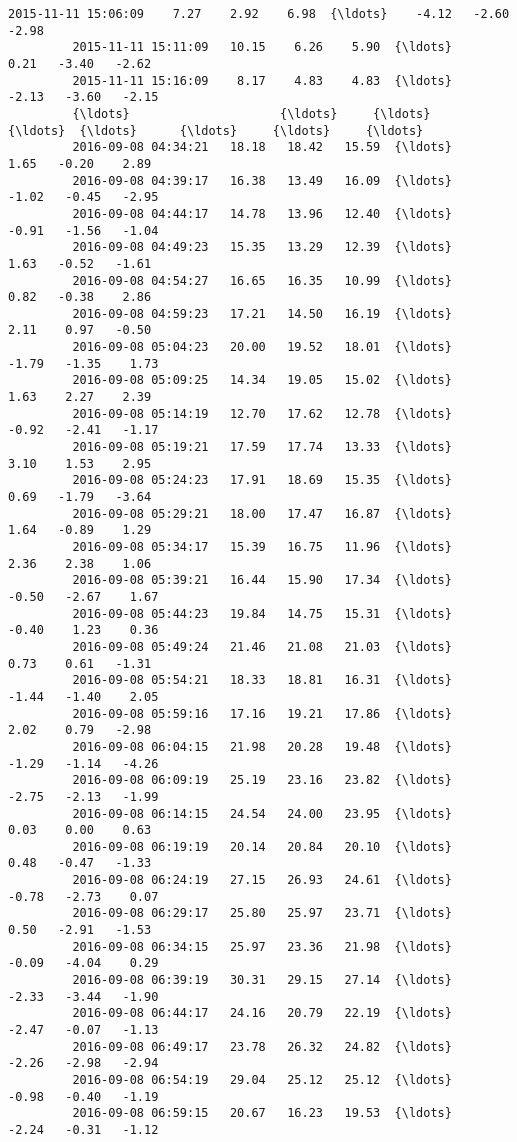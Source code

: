 \documentclass[a4paper,dvipdfmx]{jsarticle}
\begin{document}
\begin{Verbatim}[commandchars=\\\{\}]
         2015-11-11 15:06:09    7.27    2.92    6.98  {\ldots}    -4.12   -2.60   -2.98   
         2015-11-11 15:11:09   10.15    6.26    5.90  {\ldots}     0.21   -3.40   -2.62   
         2015-11-11 15:16:09    8.17    4.83    4.83  {\ldots}    -2.13   -3.60   -2.15   
         {\ldots}                     {\ldots}     {\ldots}     {\ldots}  {\ldots}      {\ldots}     {\ldots}     {\ldots}   
         2016-09-08 04:34:21   18.18   18.42   15.59  {\ldots}     1.65   -0.20    2.89   
         2016-09-08 04:39:17   16.38   13.49   16.09  {\ldots}    -1.02   -0.45   -2.95   
         2016-09-08 04:44:17   14.78   13.96   12.40  {\ldots}    -0.91   -1.56   -1.04   
         2016-09-08 04:49:23   15.35   13.29   12.39  {\ldots}     1.63   -0.52   -1.61   
         2016-09-08 04:54:27   16.65   16.35   10.99  {\ldots}     0.82   -0.38    2.86   
         2016-09-08 04:59:23   17.21   14.50   16.19  {\ldots}     2.11    0.97   -0.50   
         2016-09-08 05:04:23   20.00   19.52   18.01  {\ldots}    -1.79   -1.35    1.73   
         2016-09-08 05:09:25   14.34   19.05   15.02  {\ldots}     1.63    2.27    2.39   
         2016-09-08 05:14:19   12.70   17.62   12.78  {\ldots}    -0.92   -2.41   -1.17   
         2016-09-08 05:19:21   17.59   17.74   13.33  {\ldots}     3.10    1.53    2.95   
         2016-09-08 05:24:23   17.91   18.69   15.35  {\ldots}     0.69   -1.79   -3.64   
         2016-09-08 05:29:21   18.00   17.47   16.87  {\ldots}     1.64   -0.89    1.29   
         2016-09-08 05:34:17   15.39   16.75   11.96  {\ldots}     2.36    2.38    1.06   
         2016-09-08 05:39:21   16.44   15.90   17.34  {\ldots}    -0.50   -2.67    1.67   
         2016-09-08 05:44:23   19.84   14.75   15.31  {\ldots}    -0.40    1.23    0.36   
         2016-09-08 05:49:24   21.46   21.08   21.03  {\ldots}     0.73    0.61   -1.31   
         2016-09-08 05:54:21   18.33   18.81   16.31  {\ldots}    -1.44   -1.40    2.05   
         2016-09-08 05:59:16   17.16   19.21   17.86  {\ldots}     2.02    0.79   -2.98   
         2016-09-08 06:04:15   21.98   20.28   19.48  {\ldots}    -1.29   -1.14   -4.26   
         2016-09-08 06:09:19   25.19   23.16   23.82  {\ldots}    -2.75   -2.13   -1.99   
         2016-09-08 06:14:15   24.54   24.00   23.95  {\ldots}     0.03    0.00    0.63   
         2016-09-08 06:19:19   20.14   20.84   20.10  {\ldots}     0.48   -0.47   -1.33   
         2016-09-08 06:24:19   27.15   26.93   24.61  {\ldots}    -0.78   -2.73    0.07   
         2016-09-08 06:29:17   25.80   25.97   23.71  {\ldots}     0.50   -2.91   -1.53   
         2016-09-08 06:34:15   25.97   23.36   21.98  {\ldots}    -0.09   -4.04    0.29   
         2016-09-08 06:39:19   30.31   29.15   27.14  {\ldots}    -2.33   -3.44   -1.90   
         2016-09-08 06:44:17   24.16   20.79   22.19  {\ldots}    -2.47   -0.07   -1.13   
         2016-09-08 06:49:17   23.78   26.32   24.82  {\ldots}    -2.26   -2.98   -2.94   
         2016-09-08 06:54:19   29.04   25.12   25.12  {\ldots}    -0.98   -0.40   -1.19   
         2016-09-08 06:59:15   20.67   16.23   19.53  {\ldots}    -2.24   -0.31   -1.12   
         

\end{Verbatim}
\end{document}
